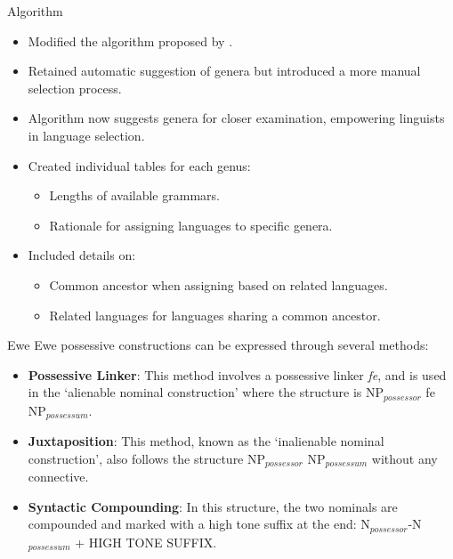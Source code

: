 \documentclass[12pt,aspectratio=169,t]{beamer}
\renewcommand{\'}{\textquotesingle}
\begin{document}
\begin{frame}{Algorithm}
	
	\begin{itemize}
		\item Modified the algorithm proposed by \cite{cheveleva2023}.
		\item Retained automatic suggestion of genera but introduced a more manual selection process.
		\item Algorithm now suggests genera for closer examination, empowering linguists in language selection.
		\item Created individual tables for each genus:
		\begin{itemize}
			\item Lengths of available grammars.
			\item Rationale for assigning languages to specific genera.
		\end{itemize}
		\item Included details on:
		\begin{itemize}
			\item Common ancestor when assigning based on related languages.
			\item Related languages for languages sharing a common ancestor.
		\end{itemize}
	\end{itemize}
\end{frame}

\begin{frame}{Ewe}
	Ewe possessive constructions can be expressed through several methods:
	
	\begin{itemize}
		\item \textbf{Possessive Linker}: This method involves a possessive linker \textit{fe}, and is used in the `alienable nominal construction' where the structure is NP$_{possessor}$ fe NP$_{possessum}$.
		\item \textbf{Juxtaposition}: This method, known as the `inalienable nominal construction', also follows the structure NP$_{possessor}$ NP$_{possessum}$ without any connective.
		
		\item \textbf{Syntactic Compounding}: In this structure, the two nominals are compounded and marked with a high tone suffix at the end: N$_{possessor}$-N$_{possessum}$ + HIGH TONE SUFFIX.
	\end{itemize}
	
\end{frame}
\end{document}
